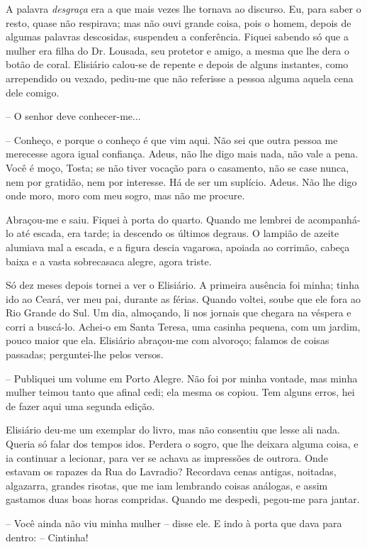 A palavra \emph{desgraça} era a que mais vezes lhe tornava ao discurso.
Eu, para saber o resto, quase não respirava; mas não ouvi grande coisa,
pois o homem, depois de algumas palavras descosidas, suspendeu a
conferência. Fiquei sabendo só que a mulher era filha do Dr. Lousada,
seu protetor e amigo, a mesma que lhe dera o botão de coral. Elisiário
calou-se de repente e depois de alguns instantes, como arrependido ou
vexado, pediu-me que não referisse a pessoa alguma aquela cena dele
comigo.

-- O senhor deve conhecer-me...

-- Conheço, e porque o conheço é que vim aqui. Não sei que outra pessoa
me merecesse agora igual confiança. Adeus, não lhe digo mais nada, não
vale a pena. Você é moço, Tosta; se não tiver vocação para o casamento,
não se case nunca, nem por gratidão, nem por interesse. Há de ser um
suplício. Adeus. Não lhe digo onde moro, moro com meu sogro, mas não me
procure.

Abraçou-me e saiu. Fiquei à porta do quarto. Quando me lembrei de
acompanhá-lo até escada, era tarde; ia descendo os últimos degraus. O
lampião de azeite alumiava mal a escada, e a figura descia vagarosa,
apoiada ao corrimão, cabeça baixa e a vasta sobrecasaca alegre, agora
triste.

Só dez meses depois tornei a ver o Elisiário. A primeira ausência foi
minha; tinha ido ao Ceará, ver meu pai, durante as férias. Quando
voltei, soube que ele fora ao Rio Grande do Sul. Um dia, almoçando, li
nos jornais que chegara na véspera e corri a buscá-lo. Achei-o em Santa
Teresa, uma casinha pequena, com um jardim, pouco maior que ela.
Elisiário abraçou-me com alvoroço; falamos de coisas passadas;
perguntei-lhe pelos versos.

-- Publiquei um volume em Porto Alegre. Não foi por minha vontade, mas
minha mulher teimou tanto que afinal cedi; ela mesma os copiou. Tem
alguns erros, hei de fazer aqui uma segunda edição.

Elisiário deu-me um exemplar do livro, mas não consentiu que lesse ali
nada. Queria só falar dos tempos idos. Perdera o sogro, que lhe deixara
alguma coisa, e ia continuar a lecionar, para ver se achava as
impressões de outrora. Onde estavam os rapazes da Rua do Lavradio?
Recordava cenas antigas, noitadas, algazarra, grandes risotas, que me
iam lembrando coisas análogas, e assim gastamos duas boas horas
compridas. Quando me despedi, pegou-me para jantar.

-- Você ainda não viu minha mulher -- disse ele. E indo à porta que dava
para dentro: -- Cintinha!

